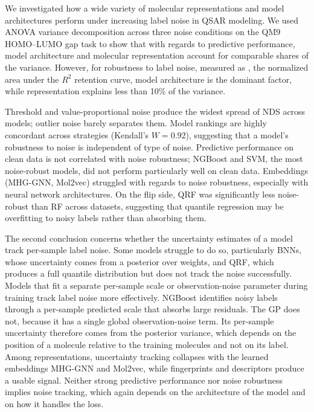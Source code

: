 We investigated how a wide variety of molecular representations and model architectures perform under increasing label noise in QSAR modeling. We used ANOVA variance decomposition across three noise conditions on the QM9 HOMO--LUMO gap task to show that with regards to predictive performance, model architecture and molecular representation account for comparable shares of the variance. However, for robustness to label noise, measured as \aucnorm, the normalized area under the $R^2$ retention curve, model architecture is the dominant factor, while representation explains less than 10\% of the variance.

Threshold and value-proportional noise produce the widest spread of NDS across models; outlier noise barely separates them. Model rankings are highly concordant across strategies (Kendall's $W = 0.92$), suggesting that a model's robustness to noise is independent of type of noise. Predictive performance on clean data is not correlated with noise robustness; NGBoost and SVM, the most noise-robust models, did not perform particularly well on clean data. Embeddings (MHG-GNN, Mol2vec) struggled with regards to noise robustness, especially with neural network architectures. On the flip side, QRF was significantly less noise-robust than RF across datasets, suggesting that quantile regression may be overfitting to noisy labels rather than absorbing them.

The second conclusion concerns whether the uncertainty estimates of a model track per-sample label noise. Some models struggle to do so, particularly BNNs, whose uncertainty comes from a posterior over weights, and QRF, which produces a full quantile distribution but does not track the noise successfully. Models that fit a separate per-sample scale or observation-noise parameter during training track label noise more effectively. NGBoost identifies noisy labels through a per-sample predicted scale that absorbs large residuals. The GP does not, because it has a single global observation-noise term. Its per-sample uncertainty therefore comes from the posterior variance, which depends on the position of a molecule relative to the training molecules and not on its label. Among representations, uncertainty tracking collapses with the learned embeddings MHG-GNN and Mol2vec, while fingerprints and descriptors produce a usable signal. Neither strong predictive performance nor noise robustness implies noise tracking, which again depends on the architecture of the model and on how it handles the loss. 

